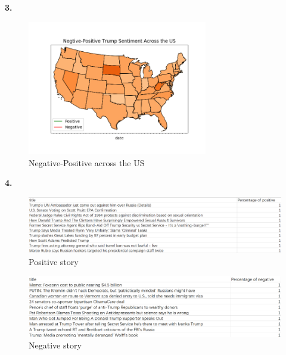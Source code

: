 \documentclass{article}
\begin{document}
\textbf{3.}
\begin{figure}[H]
\centering
\includegraphics[width=0.7\textwidth]{4.png}
\caption{Negative-Positive across the US}\label{4}
\end{figure}

\textbf{4.}
\begin{figure}[H]
\centering
\includegraphics[width=\textwidth]{10.png}
\caption{Positive story}\label{5}
\end{figure}
\begin{figure}[H]
\centering
\includegraphics[width=\textwidth]{11.png}
\caption{Negative story}\label{6}
\end{figure}
\end{document}
